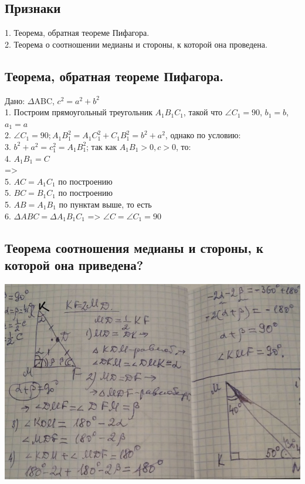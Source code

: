 \documentclass[12pt, letterpaper]{article}
\begin{document}
\subsection{Признаки}
1. Теорема, обратная теореме Пифагора. \\
2. Теорема о соотношении медианы и стороны, к которой она проведена. \\

\subsection{Теорема, обратная теореме Пифагора.}
Дано: $\Delta$ABC, $c^2=a^2+b^2$ \\
1. Построим прямоугольный треугольник $A_1 B_1 C_1$, такой что $\angle C_1 = 90 $, $b_1=b$, $a_1=a$ \\
2. $\angle C_1=90; A_1 B_1^2 = A_1 C_1^2+C_1 B_1^2 = b^2+a^2$, однако по условию:\\
3. $b^2+a^2=c_1^2 = A_1 B_1^2$; так как $A_1 B_1>0, c>0$, то: \\
4. $A_1 B_1 = C$ \\
=> \\
5. $AC = A_1 C_1 $ по построению \\
5. $BC = B_1 C_1 $ по построению \\
5. $AB = A_1 B_1 $ по пунктам выше, то есть \\
6. $\Delta ABC = \Delta A_1 B_1 C_1 $ => $\angle C = \angle C_1 = 90 $ \\

\subsection{Теорема соотношения медианы и стороны, к которой она приведена?}
\includegraphics[scale=0.3]{photo9.jpg} \\
\end{document}
